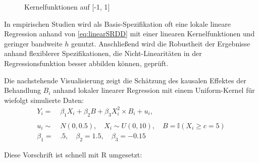 \documentclass[
  a4paper,
  DIV=11,
  oneside]{scrreprt}
\begin{document}
\begin{figure}[t]


\caption{\label{fig-linearkern}Kernelfunktionen auf {[}-1, 1{]}}

\end{figure}%

In empirischen Studien wird als Basis-Spezifikation oft eine lokale
lineare Regression anhand von \eqref{eq:linearSRDD} mit einer linearen
Kernelfunktionen und geringer bandweite \(h\) genutzt. Anschließend wird
die Robustheit der Ergebnisse anhand flexiblerer Spezifikationen, die
Nicht-Linearitäten in der Regressionsfunktion besser abbilden können,
geprüft.

Die nachstehende Visualisierung zeigt die Schätzung des kausalen
Effektes der Behandlung \(B_i\) anhand lokaler linearer Regression mit
einem Uniform-Kernel für wiefolgt simulierte Daten: \begin{align*}
  Y_i =&\, \beta_1 X_i + \beta_2 B + \beta_3 X_i^2 \times B_i + u_i,\\
  \\
  u_i \sim&\, N(0, 0.5), \quad X_i \sim U(0, 10), \quad B = \mathbb{I}(X_i \geq c = 5)\\
  \beta_1 =&\, .5, \quad \beta_2 = 1.5, \quad \beta_3 = -0.15
\end{align*}

Diese Vorschrift ist schnell mit R umgesetzt:
\end{document}
